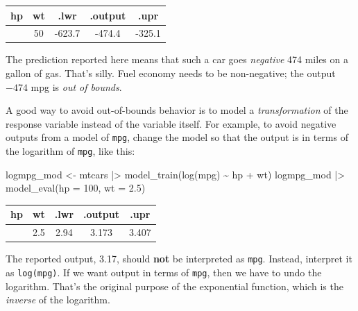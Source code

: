 \documentclass[
  letterpaper,
  DIV=11,
  numbers=noendperiod,
  oneside]{scrartcl}
\newenvironment{Shaded}{\begin{snugshade}}{\end{snugshade}}
\newcommand{\AttributeTok}[1]{\textcolor[rgb]{0.40,0.45,0.13}{#1}}
\newcommand{\DecValTok}[1]{\textcolor[rgb]{0.68,0.00,0.00}{#1}}
\newcommand{\FloatTok}[1]{\textcolor[rgb]{0.68,0.00,0.00}{#1}}
\newcommand{\FunctionTok}[1]{\textcolor[rgb]{0.28,0.35,0.67}{#1}}
\newcommand{\NormalTok}[1]{\textcolor[rgb]{0.00,0.23,0.31}{#1}}
\newcommand{\OtherTok}[1]{\textcolor[rgb]{0.00,0.23,0.31}{#1}}
\newcommand{\SpecialCharTok}[1]{\textcolor[rgb]{0.37,0.37,0.37}{#1}}
\begin{document}
\begin{longtable}[]{@{}ccccc@{}}
\toprule\noalign{}
hp & wt & .lwr & .output & .upr \\
\midrule\noalign{}
\endhead
\bottomrule\noalign{}
\endlastfoot
10000 & 50 & -623.7 & -474.4 & -325.1 \\
\end{longtable}

The prediction reported here means that such a car goes \emph{negative}
474 miles on a gallon of gas. That's silly. Fuel economy needs to be
non-negative; the output \(-474\) mpg is \emph{out of bounds}.

A good way to avoid out-of-bounds behavior is to model a
\emph{transformation} of the response variable instead of the variable
itself. For example, to avoid negative outputs from a model of
\texttt{mpg}, change the model so that the output is in terms of the
logarithm of \texttt{mpg}, like this:

\begin{Shaded}
\begin{Highlighting}[]
\NormalTok{logmpg\_mod }\OtherTok{\textless{}{-}}\NormalTok{ mtcars }\SpecialCharTok{|\textgreater{}} \FunctionTok{model\_train}\NormalTok{(}\FunctionTok{log}\NormalTok{(mpg) }\SpecialCharTok{\textasciitilde{}}\NormalTok{ hp }\SpecialCharTok{+}\NormalTok{ wt) }
\NormalTok{logmpg\_mod }\SpecialCharTok{|\textgreater{}} \FunctionTok{model\_eval}\NormalTok{(}\AttributeTok{hp =} \DecValTok{100}\NormalTok{, }\AttributeTok{wt =} \FloatTok{2.5}\NormalTok{)}
\end{Highlighting}
\end{Shaded}

\begin{longtable}[]{@{}ccccc@{}}
\toprule\noalign{}
hp & wt & .lwr & .output & .upr \\
\midrule\noalign{}
\endhead
\bottomrule\noalign{}
\endlastfoot
100 & 2.5 & 2.94 & 3.173 & 3.407 \\
\end{longtable}

The reported output, 3.17, should \textbf{not} be interpreted as
\texttt{mpg}. Instead, interpret it as \texttt{log(mpg)}. If we want
output in terms of \texttt{mpg}, then we have to undo the logarithm.
That's the original purpose of the exponential function, which is the
\emph{inverse} of the
logarithm.{}
\end{document}
